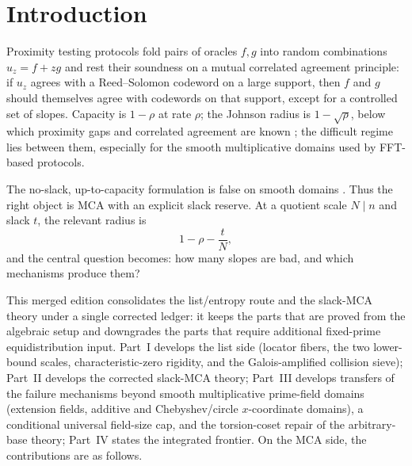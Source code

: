 \documentclass[11pt]{article}
\theoremstyle{definition}
\begin{document}
\tableofcontents

\section{Introduction}\label{sec:intro}

Proximity testing protocols \cite{FRI,WHIR} fold pairs of oracles $f,g$ into random combinations $u_z=f+zg$ and rest their soundness on a mutual correlated agreement principle: if $u_z$ agrees with a Reed--Solomon codeword on a large support, then $f$ and $g$ should themselves agree with codewords on that support, except for a controlled set of slopes.  Capacity is $1-\rho$ at rate $\rho$; the Johnson radius is $1-\sqrt\rho$, below which proximity gaps and correlated agreement are known \cite{BCIKS20,BCHKS25}; the difficult regime lies between them, especially for the smooth multiplicative domains used by FFT-based protocols.

The no-slack, up-to-capacity formulation is false on smooth domains \cite{NoSlack}.  Thus the right object is MCA with an explicit slack reserve.  At a quotient scale $N\mid n$ and slack $t$, the relevant radius is
\[
        1-\rho-\frac{t}{N},
\]
and the central question becomes: how many slopes are bad, and which mechanisms produce them?

This merged edition consolidates the list/entropy route and the slack-MCA theory under a single corrected ledger: it keeps the parts that are proved from the algebraic setup and downgrades the parts that require additional fixed-prime equidistribution input.  Part~I develops the list side (locator fibers, the two lower-bound scales, characteristic-zero rigidity, and the Galois-amplified collision sieve); Part~II develops the corrected slack-MCA theory; Part~III develops transfers of the failure mechanisms beyond smooth multiplicative prime-field domains (extension fields, additive and Chebyshev/circle $x$-coordinate domains), a conditional universal field-size cap, and the torsion-coset repair of the arbitrary-base theory; Part~IV states the integrated frontier.  On the MCA side, the contributions are as follows.
\end{document}
